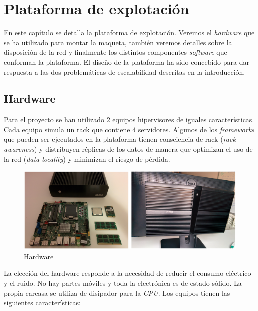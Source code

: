 \documentclass[a4paper,12pt,spanish,final]{epsc_tfc_pfc}
\begin{document}
\pagestyle{fancy}


\chapter{Plataforma de explotación}
En este capítulo se detalla la plataforma de explotación. Veremos el \emph{hardware} que se ha utilizado para montar la maqueta, también veremos detalles sobre la disposición de la red y finalmente los distintos componentes \emph{software} que conforman la plataforma. El diseño de la plataforma ha sido concebido para dar respuesta a las dos problemáticas de escalabilidad descritas en la introducción.

\section{Hardware}
Para el proyecto se han utilizado 2 equipos hipervisores de iguales características. Cada equipo simula un rack que contiene 4 servidores. Algunos de los \emph{frameworks} que pueden ser ejecutados en la plataforma tienen consciencia de rack (\emph{rack awareness}) y distribuyen réplicas de los datos de manera que optimizan el uso de la red (\emph{data locality}) y minimizan el riesgo de pérdida.\\

\begin{figure}[h]
  \centering
    \includegraphics[scale=0.32]{hardware}
      \caption{Hardware}
\end{figure}

La elección del hardware responde a la necesidad de reducir el consumo eléctrico y el ruido. No hay partes móviles y toda la electrónica es de estado sólido. La propia carcasa se utiliza de disipador para la \emph{CPU}. Los equipos tienen las siguientes características:
\end{document}
